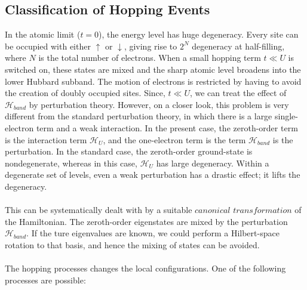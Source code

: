 \documentclass{article}
\begin{document}
\subsection{Classification of Hopping Events}
In the atomic limit ($t=0$), the energy level has huge degeneracy. Every site can be occupied with either $\uparrow$ or $\downarrow$, giving rise to $2^N$ degeneracy at half-filling, where $N$ is the total number of electrons. When a small hopping term $t \ll U$ is switched on, these states are mixed and the sharp atomic level broadens into the lower Hubbard subband. The motion of electrons is restricted by having to avoid the creation of doubly occupied sites. Since, $t \ll U$, we can treat the effect of $\mathcal{H}_{band}$ by perturbation theory. However, on a closer look, this problem is very different from the standard perturbation theory, in which there is a large single-electron term and a weak interaction. In the present case, the zeroth-order term is the interaction term $\mathcal{H}_U$, and the one-electron term is the term $\mathcal{H}_{band}$ is the perturbation. In the standard case, the zeroth-order ground-state is nondegenerate, whereas in this case, $\mathcal{H}_U$ has large degeneracy. Within a degenerate set of levels, even a weak perturbation has a drastic effect; it lifts the degeneracy.
\\\\
This can be systematically dealt with by a suitable $\textit{canonical transformation}$ of the Hamiltonian. The zeroth-order eigenstates are mixed by the perturbation $\mathcal{H}_{band}$. If the ture eigenvalues are known, we could perform a Hilbert-space rotation to that basis, and hence the mixing of states can be avoided. 
\\\\
The hopping processes changes the local configurations. One of the following processes are possible:
\\
\end{document}
